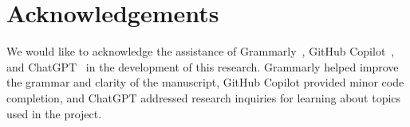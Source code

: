 \section{Acknowledgements}\label{sec:acknowledgements}

We would like to acknowledge the assistance of Grammarly~\cite{grammarly}, GitHub Copilot~\cite{github-copilot}, and ChatGPT~\cite{gpt-3} in the development of this research. Grammarly helped improve the grammar and clarity of the manuscript, GitHub Copilot provided minor code completion, and ChatGPT addressed research inquiries for learning about topics used in the project.